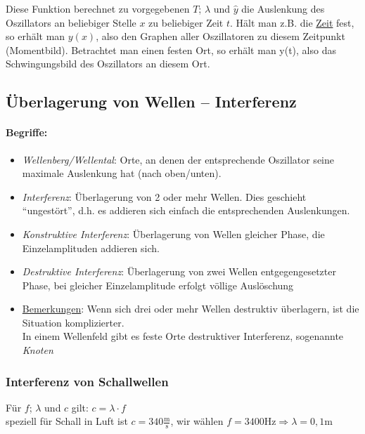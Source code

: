 \documentclass[a4paper]{scrartcl}
\begin{document}
Diese Funktion berechnet zu vorgegebenen \(T\); \(\lambda\) und \(\hat{y}\) die
Auslenkung des Oszillators an beliebiger Stelle \(x\) zu beliebiger Zeit \(t\).
Hält man z.B. die \underline{Zeit} fest, so erhält man \(y(x)\), also den
Graphen aller Oszillatoren zu diesem Zeitpunkt (Momentbild). Betrachtet man
einen festen Ort, so erhält man y(t), also das Schwingungsbild des Oszillators
an diesem Ort.

\subsection{Überlagerung von Wellen -- Interferenz}
\paragraph{Begriffe:} \begin{itemize}
	\item \emph{Wellenberg/Wellental}: Orte, an denen der entsprechende
		Oszillator seine maximale Auslenkung hat (nach oben/unten).
	\item \emph{Interferenz}: Überlagerung von 2 oder mehr Wellen. Dies
		geschieht "`ungestört"', d.h. es addieren sich einfach die
		entsprechenden Auslenkungen.
	\item \emph{Konstruktive Interferenz}: Überlagerung von Wellen gleicher
		Phase, die Einzelamplituden addieren sich.
	\item \emph{Destruktive Interferenz}: Überlagerung von zwei Wellen
		entgegengesetzter Phase, bei gleicher Einzelamplitude erfolgt völlige
		Auslöschung
	\item \underline{Bemerkungen}: Wenn sich drei oder mehr Wellen destruktiv
		überlagern, ist die Situation komplizierter.\\
		In einem Wellenfeld gibt es feste Orte destruktiver Interferenz,
		sogenannte \emph{Knoten}
\end{itemize}

\subsubsection{Interferenz von Schallwellen}
Für \(f\); \(\lambda\) und \(c\) gilt: \(c=\lambda\cdot f\)\\
speziell für Schall in Luft ist \(c=340\mathrm{\frac{m}{s}}\), wir wählen
\(f=3400\mathrm{Hz} \Rightarrow \lambda=0,1\mathrm{m}\)
\end{document}
